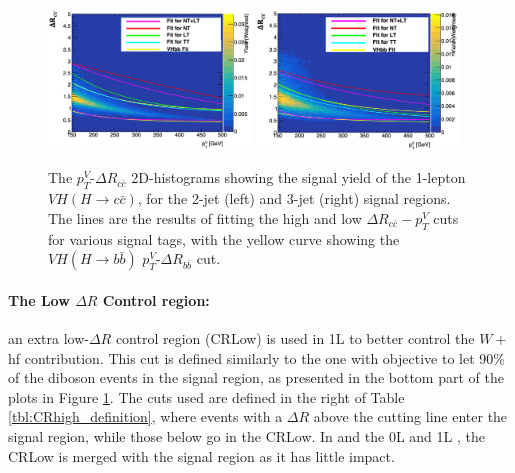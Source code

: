 \begin{figure}[h!]
    \center
    \includegraphics[width=0.48\textwidth]{Images/VH/dRccpTV/sr1.png}
    \includegraphics[width=0.48\textwidth]{Images/VH/dRccpTV/sr2.png}
    \caption{The $p_T^V$-$\Delta R_{c\bar{c}}$ 2D-histograms showing the signal yield of the 1-lepton $VH(H\rightarrow c\bar{c})$, for the 2-jet (left) and 3-jet (right) signal regions. The lines are the results of fitting the high and low $\Delta R_{c\bar{c}}-p_T^V$ cuts for various signal tags, with the yellow curve showing the $VH(H\rightarrow b\bar{b})$ $p_T^V$-$\Delta R_{b\bar{b}}$ cut.} 
    \label{fig:drccptvCutsVHcc}
\end{figure}

\paragraph{The Low $\Delta R$ Control region:} an extra low-$\Delta R$ control region (CRLow) is used in \vhb 1L to better control the $W+$hf contribution. This cut is defined similarly to the \highdr one with objective to let 90\% of the diboson events in the signal region, as presented in the bottom part of the plots in Figure \ref{fig:drccptvCutsVHcc}. The cuts used are defined in the right of Table \ref{tbl:CRhigh_definition}, where events with a $\Delta R$ above the cutting line enter the signal region, while those below go in the CRLow. In \vhc and the 0L and 1L \vhb, the CRLow is merged with the signal region as it has little impact.  \\ 



